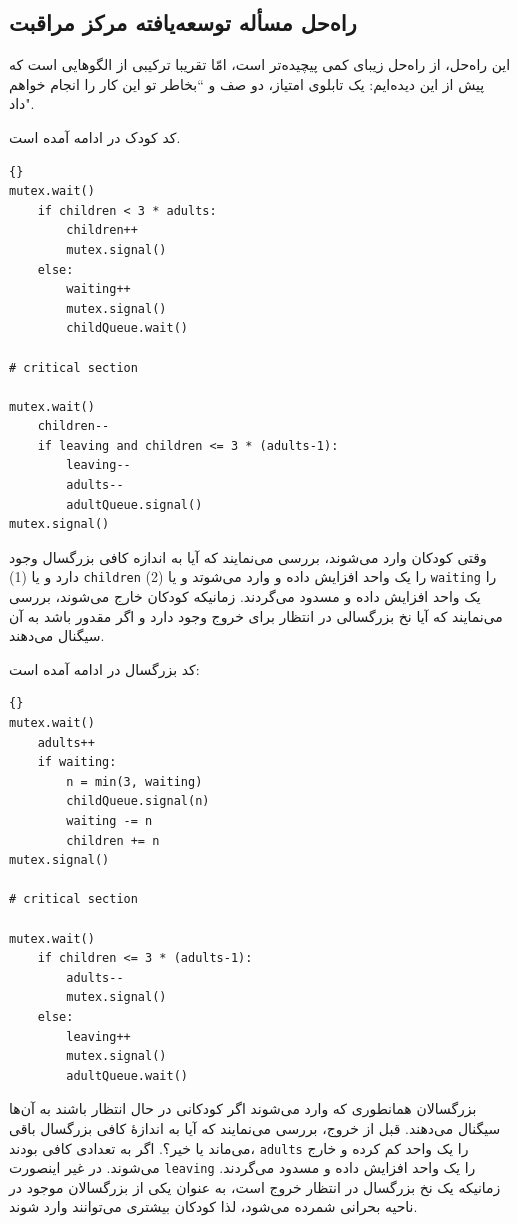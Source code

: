 \documentclass{book}
\newcommand{\clearemptydoublepage}{\newpage\cleardoublepage}
\begin{document}
\clearemptydoublepage
\subsection {راه‌حل مسأله توسعه‌یافته مرکز مراقبت}

    این راه‌حل، از را‌ه‌حل زیبای  کمی پیچیده‌تر است، امّا تقریبا ترکیبی از الگوهایی است که پیش از این  دیده‌ایم: یک تابلوی امتیاز، دو صف و 
    ‍‍‍‍‍``بخاطر تو این کار را انجام خواهم داد".

    کد کودک در ادامه آمده است. 

\begin{latin}
\begin{lstlisting}[title=\rl{راه‌حل توسعه‌یافته مرکز مراقبت از کودکان (کودک)}]{}
mutex.wait()
    if children < 3 * adults:
        children++
        mutex.signal()
    else:
        waiting++
        mutex.signal()
        childQueue.wait()

# critical section

mutex.wait()
    children--
    if leaving and children <= 3 * (adults-1):
        leaving--
        adults--
        adultQueue.signal() 
mutex.signal()
\end{lstlisting}
\end{latin}

    وقتی کودکان وارد می‌شوند، بررسی می‌نمایند که آیا به اندازه کافی بزرگسال وجود دارد و یا  (1) {\tt children} را یک واحد افزایش داده و وارد می‌شوتد و 
    یا (2) {\tt waiting}  را یک واحد افزایش داده و مسدود می‌گردند. زمانیکه کودکان خارج می‌شوند، بررسی می‌نمایند که آیا نخ بزرگسالی در انتظار برای خروج 
    وجود دارد و اگر مقدور باشد به آن سیگنال می‌دهند. 
    
\newpage
    کد بزرگسال در ادامه آمده است:

\begin{latin}
\begin{lstlisting}[title=\rl{راه‌حل توسعه‌یافته مرکز مراقبت از کودکان (بزرگسال)}]{}
mutex.wait()
    adults++
    if waiting:
        n = min(3, waiting)
        childQueue.signal(n)
        waiting -= n
        children += n
mutex.signal()

# critical section

mutex.wait()
    if children <= 3 * (adults-1):
        adults--
        mutex.signal()
    else:
        leaving++
        mutex.signal()
        adultQueue.wait() 
\end{lstlisting}
\end{latin}

    بزرگسالان همانطوری که وارد می‌شوند اگر کودکانی در حال انتظار باشند به آن‌ها سیگنال می‌دهند. قبل از خروج، بررسی می‌نمایند که آیا به اندازهٔ کافی بزرگسال 
    باقی می‌ماند یا خیر؟. اگر به تعدادی کافی بودند، {\tt adults} را یک واحد کم کرده و خارج می‌شوند. در غیر اینصورت {\tt leaving} را یک واحد افزایش 
    داده و مسدود می‌گردند. زمانیکه یک نخ بزرگسال در انتظار خروج است، به عنوان یکی از بزرگسالان موجود در ناحیه بحرانی شمرده می‌شود، لذا کودکان 
    بیشتری می‌توانند وارد شوند.     
\end{document}
